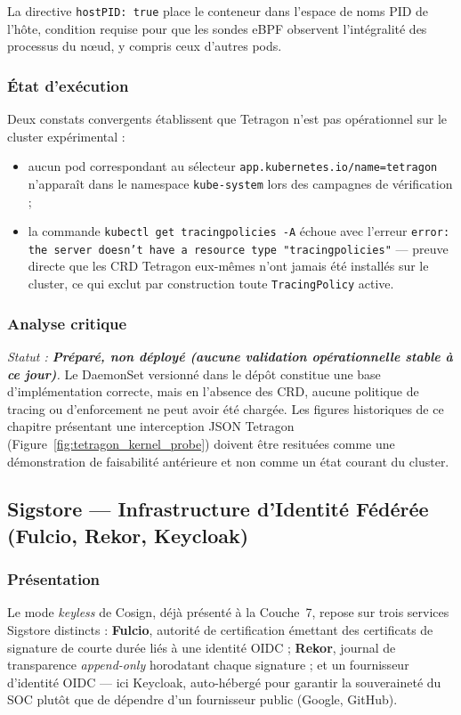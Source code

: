 La directive \texttt{hostPID: true} place le conteneur dans l'espace de noms PID de l'hôte, condition requise pour que les sondes eBPF observent l'intégralité des processus du nœud, y compris ceux d'autres pods.

\subsubsection{État d'exécution}
Deux constats convergents établissent que Tetragon n'est pas opérationnel sur le cluster expérimental :
\begin{itemize}
    \item aucun pod correspondant au sélecteur \texttt{app.kubernetes.io/name=tetragon} n'apparaît dans le namespace \texttt{kube-system} lors des campagnes de vérification ;
    \item la commande \texttt{kubectl get tracingpolicies -A} échoue avec l'erreur \texttt{error: the server doesn't have a resource type "tracingpolicies"} — preuve directe que les CRD Tetragon eux-mêmes n'ont jamais été installés sur le cluster, ce qui exclut par construction toute \texttt{TracingPolicy} active.
\end{itemize}

\subsubsection{Analyse critique}
\textit{Statut : \textbf{Préparé, non déployé (aucune validation opérationnelle stable à ce jour)}.} Le DaemonSet versionné dans le dépôt constitue une base d'implémentation correcte, mais en l'absence des CRD, aucune politique de tracing ou d'enforcement ne peut avoir été chargée. Les figures historiques de ce chapitre présentant une interception JSON Tetragon (Figure~\ref{fig:tetragon_kernel_probe}) doivent être resituées comme une démonstration de faisabilité antérieure et non comme un état courant du cluster.

\subsection{Sigstore — Infrastructure d'Identité Fédérée (Fulcio, Rekor, Keycloak)}
\label{subsec:sigstore_infra_v2}

\subsubsection{Présentation}
Le mode \textit{keyless} de Cosign, déjà présenté à la Couche~7, repose sur trois services Sigstore distincts : \textbf{Fulcio}, autorité de certification émettant des certificats de signature de courte durée liés à une identité OIDC ; \textbf{Rekor}, journal de transparence \textit{append-only} horodatant chaque signature ; et un fournisseur d'identité OIDC — ici Keycloak, auto-hébergé pour garantir la souveraineté du SOC plutôt que de dépendre d'un fournisseur public (Google, GitHub).

